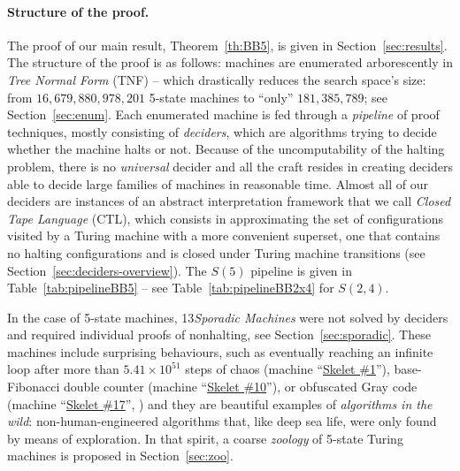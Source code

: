 \documentclass[letterpaper,british,11pt]{article}
\theoremstyle{definition} %
\numberwithin{equation}{section}
\theoremstyle{definition} %
\newcommand{\BBtheFifthTNF}{181{,}385{,}789}
\newcommand{\numSporadic}{13\xspace}
\begin{document}
\paragraph{Structure of the proof.} The proof of our main result, Theorem~\ref{th:BB5}, is given in Section~\ref{sec:results}. The structure of the proof is as follows: machines are enumerated arborescently in \textit{Tree Normal Form} (TNF) \cite{Brady64} -- which drastically reduces the search space's size: from $16{,}679{,}880{,}978{,}201$ 5-state machines to ``only'' $\BBtheFifthTNF$; see Section~\ref{sec:enum}. Each enumerated machine is fed through a \textit{pipeline} of proof techniques, mostly consisting of \textit{deciders}, which are algorithms trying to decide whether the machine halts or not. Because of the uncomputability of the halting problem, there is no \textit{universal} decider and all the craft resides in creating deciders able to decide large families of machines in reasonable time. Almost all of our deciders are instances of an abstract interpretation framework that we call \textit{Closed Tape Language} (CTL), which consists in approximating the set of configurations visited by a Turing machine with a more convenient superset, one that contains no halting configurations and is closed under Turing machine transitions (see Section~\ref{sec:deciders-overview}). The $S(5)$ pipeline is given in Table~\ref{tab:pipelineBB5} -- see Table~\ref{tab:pipelineBB2x4} for $S(2,4)$.


In the case of 5-state machines, \numSporadic \textit{Sporadic Machines} were not solved by deciders and required individual proofs of nonhalting, see Section~\ref{sec:sporadic}. These machines include surprising behaviours, such as eventually reaching an infinite loop after more than $5.41\times10^{51}$ steps of chaos (machine ``\href{https://bbchallenge.org/1RB1RD_1LC0RC_1RA1LD_0RE0LB_---1RC}{Skelet \#1}''), base-Fibonacci double counter (machine ``\href{https://bbchallenge.org/1RB0RA_0LC1RA_1RE1LD_1LC0LD_---0RB}{Skelet \#10}''), or obfuscated Gray code (machine ``\href{https://bbchallenge.org/1RB---_0LC1RE_0LD1LC_1RA1LB_0RB0RA}{Skelet \#17}'', \cite{xu2024skelet17fifthbusy}) and they are beautiful examples of \textit{algorithms in the wild}: non-human-engineered algorithms that, like deep sea life, were only found by means of exploration. In that spirit, a coarse \textit{zoology} of 5-state Turing machines is proposed in Section~\ref{sec:zoo}.
\end{document}
